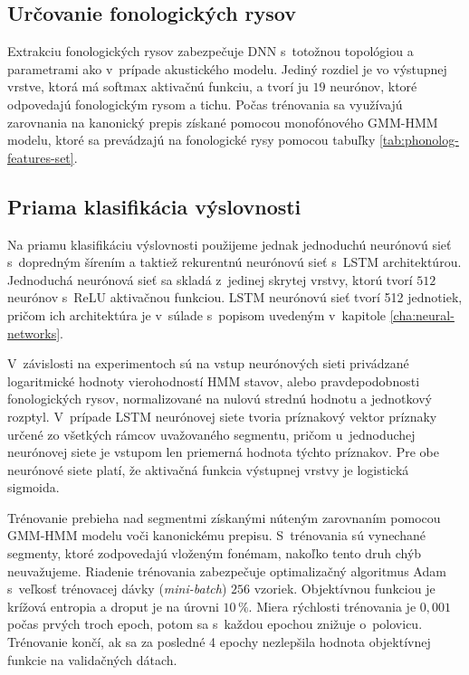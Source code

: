\subsection*{Určovanie fonologických rysov}

Extrakciu fonologických rysov zabezpečuje DNN s~totožnou topológiou a parametrami ako v~prípade akustického modelu. Jediný rozdiel je vo výstupnej vrstve, ktorá má softmax aktivačnú funkciu, a tvorí ju $19$ neurónov, ktoré odpovedajú fonologickým rysom a tichu. 
Počas trénovania sa využívajú zarovnania na kanonický prepis získané pomocou monofónového GMM-HMM modelu, ktoré sa prevádzajú na fonologické rysy pomocou tabuľky \ref{tab:phonolog-features-set}.

\subsection*{Priama klasifikácia výslovnosti}

Na priamu klasifikáciu výslovnosti použijeme jednak jednoduchú neurónovú sieť s~dopredným šírením a taktiež rekurentnú neurónovú sieť s~LSTM architektúrou. Jednoduchá neurónová sieť sa skladá z~jedinej skrytej vrstvy, ktorú tvorí $512$ neurónov s~ReLU aktivačnou funkciou. LSTM neurónovú sieť tvorí 512 jednotiek, pričom ich architektúra je v~súlade s~popisom uvedeným v~kapitole \ref{cha:neural-networks}. 

V~závislosti na experimentoch sú na vstup neurónových sieti privádzané logaritmické hodnoty vierohodností HMM stavov, alebo pravdepodobnosti fonologických rysov, normalizované na nulovú strednú hodnotu a jednotkový rozptyl. V~prípade LSTM neurónovej siete tvoria príznakový vektor príznaky určené zo všetkých rámcov uvažovaného segmentu, pričom u~jednoduchej neurónovej siete je vstupom len priemerná hodnota týchto príznakov. Pre obe neurónové siete platí, že aktivačná funkcia výstupnej vrstvy je logistická sigmoida.

Trénovanie prebieha nad segmentmi získanými núteným zarovnaním pomocou GMM-HMM modelu voči kanonickému prepisu. S~trénovania sú vynechané segmenty, ktoré zodpovedajú vloženým fonémam, nakoľko tento druh chýb neuvažujeme. Riadenie trénovania zabezpečuje optimalizačný algoritmus Adam s~veľkosť trénovacej dávky (\textit{mini-batch}) $256$ vzoriek. Objektívnou funkciou je krížová entropia a droput je na úrovni $10\,\%$. Miera rýchlosti trénovania je $0{,}001$ počas prvých troch epoch, potom sa s~každou epochou znižuje o~polovicu. Trénovanie končí, ak sa za posledné 4 epochy nezlepšila hodnota objektívnej funkcie na validačných dátach. 

